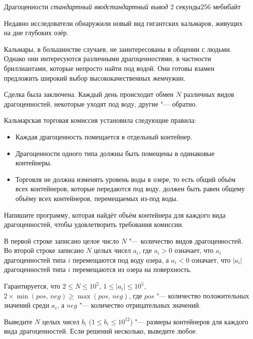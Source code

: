 %
%
\begin{problem}{Драгоценности}
{\textsl{стандартный ввод}}{\textsl{стандартный вывод}}
{2 секунды}{256 мебибайт}{}

Недавно исследователи обнаружили новый вид гигантских кальмаров, живущих
на дне глубоких озёр.

Кальмары, в большинстве случаев, не заинтересованы в общении с людьми.
Однако они интересуются различными драгоценностями, в частности
бриллиантами, которые непросто найти под водой.
Они готовы взамен предложить широкий выбор высококачественных жемчужин.

Сделка была заключена.
Каждый день происходит обмен $N$ различных видов драгоценностей,
некоторые уходят под воду, другие "--- обратно.

Кальмарская торговая комиссия установила следующие правила:
\begin{itemize}
  \item Каждая драгоценность помещается в отдельный контейнер.
  \item Драгоценности одного типа должны быть помещены в одинаковые
    контейнеры.
  \item Торговля не должна изменять уровень воды в озере, то есть
    общий объём всех контейнеров, которые передаются под воду,
    должен быть равен общему объёму всех контейнеров, перемещаемых
    из-под воды.
\end{itemize}

Напишите программу, которая найдёт объём контейнера для каждого
вида драгоценностей, чтобы удовлетворить требования комиссии.

\InputFile

В первой строке записано целое число $N$ "--- количество видов
драгоценностей.
Во второй строке записано $N$ целых чисел $a_i$, где
$a_i > 0$ означает, что $a_i$ драгоценностей типа $i$ перемещаются
под воду озера, а $a_i < 0$ означает, что $\left|a_i\right|$
драгоценностей типа $i$ перемещаются из озера на поверхность.

Гарантируется, что $2 \le N \le 10^5$, $1 \le |a_i| \le 10^5$,
$2 \times \min (pos,\,neg) \ge \max (pos,\,neg)$,
где $pos$ "--- количество положительных значений среди $a_i$, а $neg$ "---
количество отрицательных значений.

\OutputFile

Выведите $N$ целых чисел $b_{i}$ ($1 \le b_i \le 10^{12}$) "---
размеры контейнеров для каждого вида драгоценностей.
Если решений несколько, выведите любое.

\Example

\begin{example}
%
\end{example}

\end{problem}
